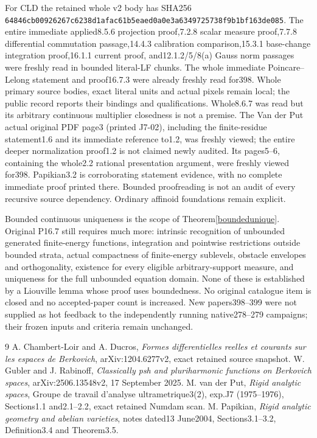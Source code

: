 \documentclass[11pt]{article}
\begin{document}
For CLD the retained whole v2 body has SHA256
\texttt{64846cb00926267c6238d1afac61b5eaed0a0e3a6349725738f9b1bf163de085}.
The entire immediate applied8.5.6 projection proof,7.2.8 scalar measure
proof,7.7.8 differential commutation passage,14.4.3 calibration
comparison,15.3.1 base-change integration proof,16.1.1 current proof,
and12.1.2/5/8(a) Gauss norm passages were freshly read in bounded
literal-LF chunks. The whole immediate Poincare--Lelong statement
and proof16.7.3 were already freshly read for398. Whole primary source
bodies, exact literal units and actual pixels remain local; the public
record reports their bindings and qualifications. Whole8.6.7 was read
but its arbitrary continuous multiplier closedness is not a premise.
The Van der Put actual original PDF page3 (printed J7-02), including
the finite-residue statement1.6 and its immediate reference to1.2,
was freshly viewed; the entire deeper normalization proof1.2 is not
claimed newly audited. Its pages5--6, containing the whole2.2 rational
presentation argument, were freshly viewed for398. Papikian3.2 is
corroborating statement evidence, with no complete immediate proof
printed there. Bounded proofreading is not an audit of every recursive
source dependency. Ordinary affinoid foundations remain explicit.

Bounded continuous uniqueness is the scope of
Theorem\ref{boundedunique}. Original P16.7 still requires much more:
intrinsic recognition of unbounded generated finite-energy functions,
integration and pointwise restrictions outside bounded strata,
actual compactness of finite-energy sublevels, obstacle envelopes and
orthogonality, existence for every eligible arbitrary-support measure,
and uniqueness for the full unbounded equation domain. None of these
is established by a Liouville lemma whose proof uses boundedness.
No original catalogue item is closed and no accepted-paper count is
increased. New papers398--399 were not supplied as hot feedback to
the independently running native278--279 campaigns; their frozen
inputs and criteria remain unchanged.

\begin{thebibliography}{9}
 A. Chambert-Loir and A. Ducros,
\emph{Formes differentielles reelles et courants sur les espaces de
Berkovich}, arXiv:1204.6277v2, exact retained source snapshot.
 W. Gubler and J. Rabinoff,
\emph{Classically psh and pluriharmonic functions on Berkovich spaces},
arXiv:2506.13548v2, 17 September 2025.
 M. van der Put, \emph{Rigid analytic spaces},
Groupe de travail d'analyse ultrametrique3(2), exp.J7 (1975--1976),
Sections1.1 and2.1--2.2, exact retained Numdam scan.
 M. Papikian, \emph{Rigid analytic geometry and abelian
varieties}, notes dated13 June2004, Sections3.1--3.2, Definition3.4
and Theorem3.5.
\end{thebibliography}
\end{document}
